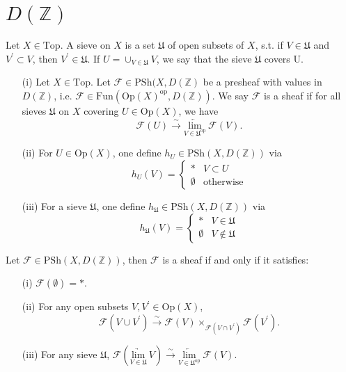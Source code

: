 \documentclass[UTF8,12,a4paper]{ctexart}
\theoremstyle{definition}
\begin{document}
\newpage
\section{$D(\mathbb{Z})$}

\dfn 
Let $X\in\text{Top}.$ A sieve on $X$ is a set $\mathfrak{U}$ of open subsets of $X$, s.t. if $V\in\mathfrak{U}$ and $V^\prime \subset V$, then $V^\prime\in \mathfrak{U}$. If $U=\cup_{V\in\mathfrak{U}} V$, we say that the sieve $\mathfrak{U}$ covers U.

\dfn 
\begin{itemize}
	\item [(i)]Let $X\in \text{Top}$. Let $\mathcal{F}\in\text{PSh}(X,D(\mathbb{Z})$ be a presheaf with values in $D(\mathbb{Z})$, i.e. $\mathcal{F}\in\text{Fun}(\text{Op}(X)^\text{op}, D(\mathbb{Z}))$. We say $\mathcal{F}$ is a sheaf if for all sieves $\mathfrak{U}$ on $X$ covering $U\in\text{Op}(X)$, we have
	$$
	\mathcal{F}(U)\stackrel{\sim}{\longrightarrow} \underset{V\in\mathfrak{U}^\text{op}}{\underleftarrow{\text{lim}}}\ \mathcal{F}(V).
	$$
	\item [(ii)]For $U\in\text{Op}(X)$, one define $h_U\in\text{PSh}(X,D(\mathbb{Z}))$ via
		\begin{equation*}
		h_U(V)=
		\begin{cases}
		*& V\subset U \\
		\emptyset& \text{otherwise}		
		\end{cases}
		\end{equation*}
	\item [(iii)]For a sieve $\mathfrak{U}$, one define $h_\mathfrak{U}\in\text{PSh}(X,D(\mathbb{Z}))$ via
		\begin{equation*}
		h_\mathfrak{U}(V)=
		\begin{cases}
		*& V\in \mathfrak{U}\\
		\emptyset&  V\notin \mathfrak{U}	
		\end{cases}
		\end{equation*}
\end{itemize}


\prop 
Let $\mathcal{F}\in \text{PSh}(X,D(\mathbb{Z}))$, then $\mathcal{F}$ is a sheaf if and only if it satisfies:
\begin{itemize}
	\item [(i)] $\mathcal{F}(\emptyset)=*$.
	\item [(ii)] For any open subsets $V, V^\prime\in \text{Op}(X)$,
	$$
	\mathcal{F}(V\cup V^\prime)\stackrel{\sim}{\longrightarrow} \mathcal{F}(V)\times_{\mathcal{F}(V\cap V^\prime)} \mathcal{F}(V^\prime).
	$$
	\item [(iii)] For any sieve $\mathfrak{U}$, 
	$
	\mathcal{F}(\underset{V\in\mathfrak{U}}{\underrightarrow{\text{lim}}}\ V)\stackrel{\sim}{\longrightarrow} \underset{V\in\mathfrak{U}^\text{op}}{\underleftarrow{\text{lim}}}\ \mathcal{F}(V).
	$
\end{itemize}
\end{document}
